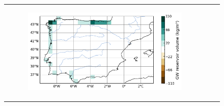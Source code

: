 \begin{figure}[htbp]
\begin{tabular}{ccc}
\begin{subfigure}[b]{0.33\textwidth}
            \includegraphics[width=\textwidth]{images/chap3/maps/slowr_diff.png}
        \end{subfigure} \\
        

\end{tabular}
\end{figure}
